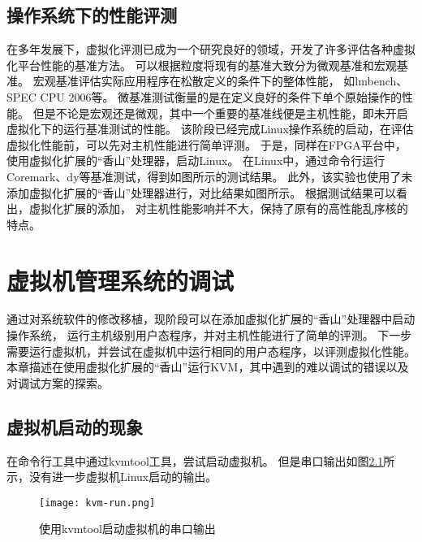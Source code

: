 \section{操作系统下的性能评测}
在多年发展下，虚拟化评测已成为一个研究良好的领域，开发了许多评估各种虚拟化平台性能的基准方法。
可以根据粒度将现有的基准大致分为微观基准和宏观基准。
宏观基准评估实际应用程序在松散定义的条件下的整体性能，
如lmbench、SPEC CPU 2006等。
微基准测试衡量的是在定义良好的条件下单个原始操作的性能。
但是不论是宏观还是微观，其中一个重要的基准线便是主机性能，即未开启虚拟化下的运行基准测试的性能。
该阶段已经完成Linux操作系统的启动，在评估虚拟化性能前，可以先对主机性能进行简单评测。
于是，同样在FPGA平台中，使用虚拟化扩展的“香山”处理器，启动Linux。
在Linux中，通过命令行运行Coremark、dy等基准测试，得到如图所示的测试结果。
此外，该实验也使用了未添加虚拟化扩展的“香山”处理器进行，对比结果如图所示。
根据测试结果可以看出，虚拟化扩展的添加，
对主机性能影响并不大，保持了原有的高性能乱序核的特点。

\chapter{虚拟机管理系统的调试}
通过对系统软件的修改移植，现阶段可以在添加虚拟化扩展的“香山”处理器中启动操作系统，
运行主机级别用户态程序，并对主机性能进行了简单的评测。
下一步需要运行虚拟机，并尝试在虚拟机中运行相同的用户态程序，以评测虚拟化性能。
本章描述在使用虚拟化扩展的“香山”运行KVM，其中遇到的难以调试的错误以及对调试方案的探索。

\section{虚拟机启动的现象}
在命令行工具中通过kvmtool工具，尝试启动虚拟机。
但是串口输出如图\ref{fig:kvm-run}所示，没有进一步虚拟机Linux启动的输出。

\begin{figure}[htbp]
    \centering
    \texttt{[image: kvm-run.png]}
    \caption{使用kvmtool启动虚拟机的串口输出}
    \label{fig:kvm-run}
\end{figure}

